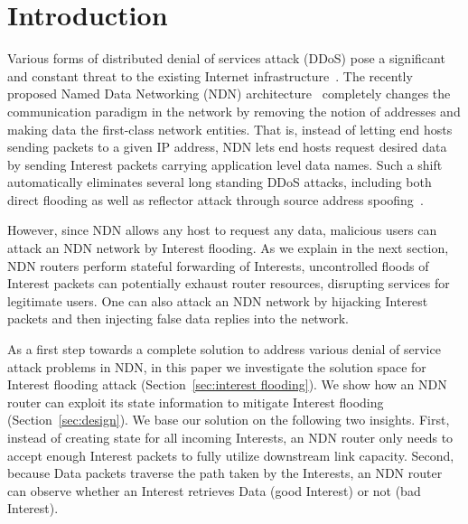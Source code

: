 \section{Introduction}
\label{sec:intro}





Various forms of distributed denial of services attack (DDoS) pose a significant and constant threat to the existing Internet infrastructure~\cite{arbor-report}.
The recently proposed Named Data Networking (NDN) architecture~\cite{ndn-conext, ndn-tr} completely changes the communication paradigm in the network by removing the notion of addresses and making data the first-class network entities.
That is, instead of letting end hosts sending packets to a given IP address, NDN lets end hosts request desired data by sending Interest packets carrying application level data names.
Such a shift automatically eliminates several long standing DDoS attacks, including both direct flooding as well as reflector attack through source address spoofing~\cite{mirkovic2004taxonomy}.

However, since NDN allows any host to request any data, malicious users can attack an NDN network by Interest flooding. As we explain in the next section, NDN routers perform stateful forwarding of Interests, uncontrolled floods of Interest packets can potentially exhaust router resources, disrupting services for legitimate users.  
One can also attack an NDN network by hijacking Interest packets and then injecting false data replies into the network.
 
As a first step towards a complete solution to address various denial of service attack problems in NDN, in this paper we investigate the solution space for Interest flooding attack (Section~\ref{sec:interest flooding}).  
We show how an NDN router can exploit its state information to mitigate Interest flooding (Section~\ref{sec:design}).
We base our solution on the following two insights.
First, instead of creating state for all incoming Interests, an NDN router only needs to accept enough Interest packets to fully utilize downstream link capacity.
Second, because Data packets traverse the path taken by the Interests, an NDN router can observe whether an Interest retrieves Data (good Interest) or not (bad Interest).
 
